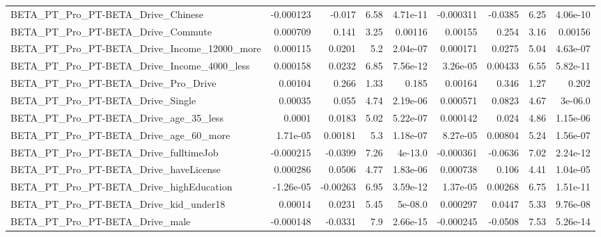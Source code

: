 \begin{tabular}{lrrrrrrrr}
BETA\_PT\_Pro\_PT-BETA\_Drive\_Chinese                  &   -0.000123 &       -0.017 &      6.58 & 4.71e-11 &  -0.000311 &     -0.0385 &         6.25 &      4.06e-10 \\
BETA\_PT\_Pro\_PT-BETA\_Drive\_Commute                  &    0.000709 &        0.141 &      3.25 &  0.00116 &    0.00155 &       0.254 &         3.16 &       0.00156 \\
BETA\_PT\_Pro\_PT-BETA\_Drive\_Income\_12000\_more        &    0.000115 &       0.0201 &       5.2 & 2.04e-07 &   0.000171 &      0.0275 &         5.04 &      4.63e-07 \\
BETA\_PT\_Pro\_PT-BETA\_Drive\_Income\_4000\_less         &    0.000158 &       0.0232 &      6.85 & 7.56e-12 &   3.26e-05 &     0.00433 &         6.55 &      5.82e-11 \\
BETA\_PT\_Pro\_PT-BETA\_Drive\_Pro\_Drive                &     0.00104 &        0.266 &      1.33 &    0.185 &    0.00164 &       0.346 &         1.27 &         0.202 \\
BETA\_PT\_Pro\_PT-BETA\_Drive\_Single                   &     0.00035 &        0.055 &      4.74 & 2.19e-06 &   0.000571 &      0.0823 &         4.67 &       3e-06.0 \\
BETA\_PT\_Pro\_PT-BETA\_Drive\_age\_35\_less              &      0.0001 &       0.0183 &      5.02 & 5.22e-07 &   0.000142 &       0.024 &         4.86 &      1.15e-06 \\
BETA\_PT\_Pro\_PT-BETA\_Drive\_age\_60\_more              &    1.71e-05 &      0.00181 &       5.3 & 1.18e-07 &   8.27e-05 &     0.00804 &         5.24 &      1.56e-07 \\
BETA\_PT\_Pro\_PT-BETA\_Drive\_fulltimeJob              &   -0.000215 &      -0.0399 &      7.26 &  4e-13.0 &  -0.000361 &     -0.0636 &         7.02 &      2.24e-12 \\
BETA\_PT\_Pro\_PT-BETA\_Drive\_haveLicense              &    0.000286 &       0.0506 &      4.77 & 1.83e-06 &   0.000738 &       0.106 &         4.41 &      1.04e-05 \\
BETA\_PT\_Pro\_PT-BETA\_Drive\_highEducation            &   -1.26e-05 &     -0.00263 &      6.95 & 3.59e-12 &   1.37e-05 &     0.00268 &         6.75 &      1.51e-11 \\
BETA\_PT\_Pro\_PT-BETA\_Drive\_kid\_under18              &     0.00014 &       0.0231 &      5.45 &  5e-08.0 &   0.000297 &      0.0447 &         5.33 &      9.76e-08 \\
BETA\_PT\_Pro\_PT-BETA\_Drive\_male                     &   -0.000148 &      -0.0331 &       7.9 & 2.66e-15 &  -0.000245 &     -0.0508 &         7.53 &      5.26e-14 \\

\end{tabular}
